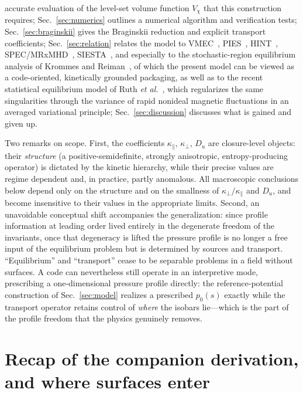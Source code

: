 \documentclass[english]{article}
\begin{document}
accurate evaluation of the level-set volume function $V_\chi$ that this construction requires;
Sec.~\ref{sec:numerics} outlines a numerical
algorithm and verification tests; Sec.~\ref{sec:braginskii} gives the Braginskii reduction and
explicit transport coefficients; Sec.~\ref{sec:relation} relates the
model to VMEC~\cite{hirshman1983}, PIES~\cite{reiman1986}, HINT~\cite{harafuji1989,suzuki2006},
SPEC/MRxMHD~\cite{hudson2012,qu2021}, SIESTA~\cite{hirshman2011}, and especially to the
stochastic-region equilibrium analysis of Krommes and Reiman~\cite{krommes2009}, of which the
present model can be viewed as a code-oriented, kinetically grounded packaging, as well as to the
recent statistical equilibrium model of Ruth \emph{et al.}~\cite{ruth2026}, which regularizes the
same singularities through the variance of rapid nonideal magnetic fluctuations in an averaged
variational principle;
Sec.~\ref{sec:discussion} discusses what is gained and given up.

Two remarks on scope. First, the coefficients $\kappa_\parallel$, $\kappa_\perp$, $D_u$ are
closure-level objects: their \emph{structure} (a positive-semidefinite, strongly anisotropic,
entropy-producing operator) is dictated by the kinetic hierarchy, while their precise values are
regime dependent and, in practice, partly anomalous. All macroscopic conclusions below depend only
on the structure and on the smallness of $\kappa_\perp/\kappa_\parallel$ and $D_u$, and become
insensitive to their values in the appropriate limits. Second, an unavoidable conceptual shift
accompanies the generalization: since profile information at leading order lived entirely in the
degenerate freedom of the invariants, once that degeneracy is lifted the pressure profile is no
longer a free input of the equilibrium problem but is determined by sources and transport.
``Equilibrium'' and ``transport'' cease to be separable problems in a field without surfaces. A
code can nevertheless still operate in an interpretive mode, prescribing a one-dimensional
pressure profile directly: the reference-potential construction of Sec.~\ref{sec:model} realizes a
prescribed $p_0(s)$ exactly while the transport operator retains control of \emph{where} the
isobars lie---which is the part of the profile freedom that the physics genuinely removes.

\section{Recap of the companion derivation, and where surfaces enter}
\label{sec:recap}
\end{document}
